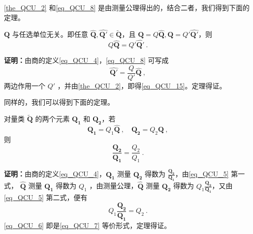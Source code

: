 \autoref{the_QCU_2} 和\autoref{eq_QCU_8} 是由测量公理得出的，结合二者，我们得到下面的定理。
\begin{theorem}{}\label{the_QCU_3}
$\boldsymbol{Q}$ 与任选单位无关。即任意 $\hat{\boldsymbol{Q}},\hat{\boldsymbol{Q'}}\in\tilde{\boldsymbol{Q}}$，且 $\boldsymbol{Q}=Q\hat{\boldsymbol{Q}},\boldsymbol{Q}=Q'\hat{\boldsymbol{Q'}}$，则
\begin{equation}\label{eq_QCU_15}
Q\hat{\boldsymbol{Q}}=Q'\hat{\boldsymbol{Q'}}~.
\end{equation}
\end{theorem}
\textbf{证明：}由商的定义\autoref{eq_QCU_4}，\autoref{eq_QCU_8} 可写成
\begin{equation}
\hat{\boldsymbol{Q'}}=\frac{Q}{Q'}\hat{\boldsymbol{Q}}~,
\end{equation}
两边作用一个 $Q'$ ，并由\autoref{the_QCU_2}，即得\autoref{eq_QCU_15}。定理得证。

同样的，我们可以得到下面的定理。
\begin{theorem}{}\label{the_QCU_1}
对量类 $\tilde{\boldsymbol{Q}}$ 的两个元素 $\boldsymbol{Q_1}$ 和 $\boldsymbol{Q_2}$，若
\begin{equation}\label{eq_QCU_5}
\boldsymbol{Q_1}=Q_1\hat{\boldsymbol{Q}}~,\quad \boldsymbol{Q_2}=Q_2\hat{\boldsymbol{Q}}~,
\end{equation}
则
\begin{equation}\label{eq_QCU_7}
\frac{\boldsymbol{Q_2}}{\boldsymbol{Q_1}}=\frac{Q_2}{Q_1}~.
\end{equation}
\end{theorem}
\textbf{证明：}由商的定义\autoref{eq_QCU_4}，$\boldsymbol{Q_1}$ 测量 $\boldsymbol{Q_2}$ 得数为 $\frac{\boldsymbol{Q_2}}{\boldsymbol{Q_1}}$，由\autoref{eq_QCU_5} 第一式， $\hat{\boldsymbol{Q}}$ 测量 $\boldsymbol{Q_1}$ 得数为 $Q_1$ ，由测量公理，$\hat{\boldsymbol{Q}}$ 测量 $\boldsymbol{Q_2}$ 得数为 $Q_1\frac{\boldsymbol{Q_2}}{\boldsymbol{Q_1}}$，又由\autoref{eq_QCU_5} 第二式，便有
\begin{equation}\label{eq_QCU_6}
Q_1\frac{\boldsymbol{Q_2}}{\boldsymbol{Q_1}}=Q_2~.
\end{equation}
\autoref{eq_QCU_6} 即是\autoref{eq_QCU_7} 等价形式，定理得证。


